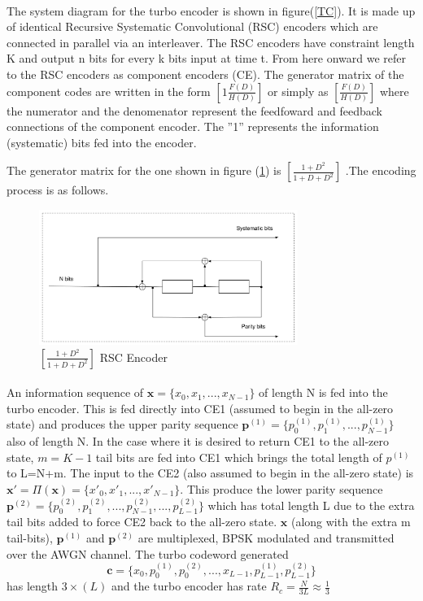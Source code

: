 \documentclass[20 pts]{article}
\begin{document}
\paragraph{}The system diagram for the turbo encoder is shown in figure(\ref{TC}).
 It is made up of identical Recursive Systematic Convolutional (RSC) encoders which 
 are connected
  in parallel via an interleaver. The RSC encoders have constraint length K and output
  n bits for every k bits input at time t.
  From here onward we refer to the RSC encoders as component 
encoders (CE). The generator matrix of the component codes are written in 
the form $[1 \frac{F(D)}{H(D)}]$ or simply as $[\frac{F(D)}{H(D)}]$
where the numerator and the denomenator represent the feedfoward and feedback
 connections of the component encoder. The ''1'' represents the information 
 (systematic) bits fed into the encoder.

 The generator matrix for the one shown in figure (\ref{RSC})
 is $[\frac{1+D^2}{1+D+D^2}]$ .The encoding process is as follows.

\begin{figure}[h!]
\centering
		\includegraphics[width=0.75\textwidth]{RSCExample3.pdf}
		\caption{$[\frac{1+D^2}{1+D+D^2}]$  RSC Encoder}
		\label{RSC}
		\end{figure}
	
\paragraph{}An information sequence of $\mathbf{x}=\{x_0,x_1,...,x_{N-1} \} $
of length N is fed into the turbo encoder. This is fed directly into CE1 (assumed to 
begin in the all-zero state) and produces the upper parity sequence 
$\mathbf{p}^{(1)}=\{p^{(1)}_0,p^{(1)}_1,...,p^{(1)}_{N-1} \}$ also of length N. 
In the case where it is desired to return CE1 to the all-zero state, $m=K-1$ tail bits 
are fed into CE1 which brings the total length of $p^{(1)}$ to L=N+m.
The input to the CE2 (also assumed to 
begin in the all-zero state) is 
$\mathbf{x'}=\Pi(\mathbf{x})= \{x'_0,x'_1,...,x'_{N-1} \} $. This produce the lower 
parity sequence 
$\mathbf{p}^{(2)}=\{p^{(2)}_0,p^{(2)}_1,...,p^{(2)}_{N-1},...,p^{(2)}_{L-1} \}$
 which has total length L due to the extra tail bits added to force CE2 back to the
 all-zero state. 
 $\mathbf{x}$ (along with the extra m tail-bits), $\mathbf{p}^{(1)}$
 and $\mathbf{p}^{(2)}$ are multiplexed, BPSK modulated and transmitted over the
 AWGN channel.
 The turbo codeword generated  
 $$\mathbf{c}=\{x_0,p^{(1)}_0,p^{(2)}_0,...,x_{L-1},p^{(1)}_{L-1},p^{(2)}_{L-1} \} $$ 
 has length $3\times(L)$ and the
 turbo encoder has rate $R_c=\frac{N}{3L} \approx \frac{1}{3}$
 
\end{document}
